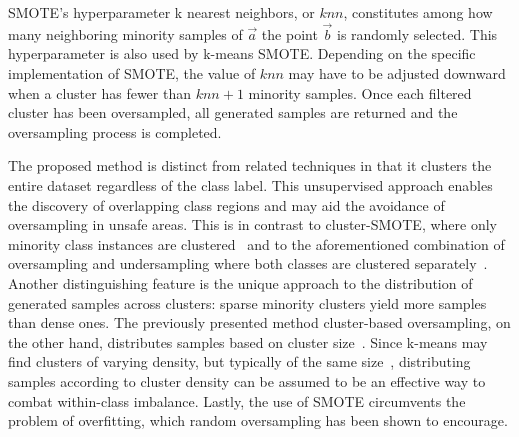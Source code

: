 \documentclass[sort&compress]{elsarticle}
\begin{document}
	\ac{SMOTE}'s hyperparameter k nearest neighbors, or $knn$, constitutes among
	how many neighboring minority samples of $\vec{a}$ the point $\vec{b}$ is
	randomly selected. This hyperparameter is also used by k-means \ac{SMOTE}.
	Depending on the specific implementation of \ac{SMOTE}, the value of $knn$
	may have to be adjusted downward when a cluster has fewer than $knn + 1$
	minority samples. Once each filtered cluster has been oversampled, all
	generated samples are returned and the oversampling process is completed.

	The proposed method is distinct from related techniques in that it clusters
	the entire dataset regardless of the class label. This unsupervised approach
	enables the discovery of overlapping class regions and may aid the avoidance
	of oversampling in unsafe areas. This is in contrast to cluster-SMOTE, where
	only minority class instances are clustered~\citep{Cieslak.2006} and to the
	aforementioned combination of oversampling and undersampling where both
	classes are clustered separately~\citep{Song.2016}. Another distinguishing
	feature is the unique approach to the distribution of generated samples
	across clusters: sparse minority clusters yield more samples than dense
	ones. The previously presented method cluster-based oversampling, on the
	other hand, distributes samples based on cluster size~\citep{Jo.2004}. Since
	k-means may find clusters of varying density, but typically of the same
	size~\citep{MacQueen.1967, Wu.2010}, distributing samples according to
	cluster density can be assumed to be an effective way to combat within-class
	imbalance. Lastly, the use of \ac{SMOTE} circumvents the problem of
	overfitting, which random oversampling has been shown to encourage.
	
\end{document}
